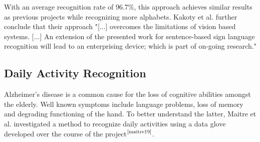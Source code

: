 \documentclass[hyperref, bachelorofscience]{cgvpub}
\newcommand{\newcite}[1]{$ ^{\text{\cite{#1}}} $}
\begin{document}
With an average recognition rate of 96.7\%, this approach achieves similar results as previous projects while recognizing more alphabets. Kakoty et al. further conclude that their approach "[$\dots$] overcomes the limitations of vision based systems. [$\dots$] An extension of the presented work for sentence-based sign language recognition will lead to an enterprising device; which is part of on-going research."

\subsection{Daily Activity Recognition}
Alzheimer's disease is a common cause for the loss of cognitive abilities amongst the elderly. Well known symptoms include language problems, loss of memory and degrading functioning of the hand. To better understand the latter, Maitre et al. investigated a method to recognize daily activities using a data glove developed over the course of the project\newcite{maitre19}.
\end{document}
